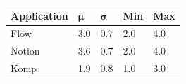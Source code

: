 		\begin{table}[!htpb]
		  \centering
		   \label{tab:app-usability-scores}
		  \begin{tabular}{|p{3cm}|R{1cm}|R{1cm}|R{1cm}|R{1cm}|}
		  	\hline
		  	\textbf{Application} & \begin{math}\bm{\mu}\end{math} & \begin{math}\bm{\sigma}\end{math} & \textbf{Min} & \textbf{Max} \\ \hline

		  	Flow 	& 3.0 & 0.7 & 2.0 & 4.0 \\ \hline
		  	Notion 	& 3.6 & 0.7 & 2.0 & 4.0 \\ \hline 
		  	Komp 	& 1.9 & 0.8 & 1.0 & 3.0 \\ \hline
			
		  \end{tabular}
		\end{table}

	


